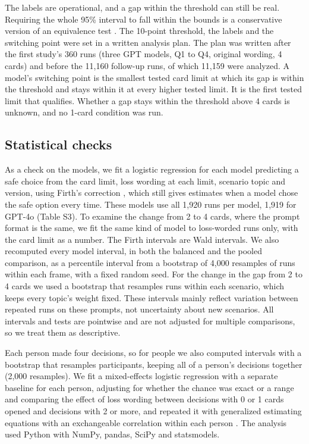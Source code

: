 \documentclass[11pt]{article}
\begin{document}
The labels are operational, and a gap within the threshold can still be real. Requiring the whole 95\% interval to fall within the bounds is a conservative version of an equivalence test \citep{lakens2017equivalence}. The 10-point threshold, the labels and the switching point were set in a written analysis plan. The plan was written after the first study's 360 runs (three GPT models, Q1 to Q4, original wording, 4 cards) and before the 11,160 follow-up runs, of which 11,159 were analyzed. A model's switching point is the smallest tested card limit at which its gap is within the threshold and stays within it at every higher tested limit. It is the first tested limit that qualifies. Whether a gap stays within the threshold above 4 cards is unknown, and no 1-card condition was run.

\subsection{Statistical checks}

As a check on the models, we fit a logistic regression for each model predicting a safe choice from the card limit, loss wording at each limit, scenario topic and version, using Firth's correction \citep{firth1993bias}, which still gives estimates when a model chose the safe option every time. These models use all 1,920 runs per model, 1,919 for GPT-4o (Table S3). To examine the change from 2 to 4 cards, where the prompt format is the same, we fit the same kind of model to loss-worded runs only, with the card limit as a number. The Firth intervals are Wald intervals. We also recomputed every model interval, in both the balanced and the pooled comparison, as a percentile interval from a bootstrap of 4,000 resamples of runs within each frame, with a fixed random seed. For the change in the gap from 2 to 4 cards we used a bootstrap that resamples runs within each scenario, which keeps every topic's weight fixed. These intervals mainly reflect variation between repeated runs on these prompts, not uncertainty about new scenarios. All intervals and tests are pointwise and are not adjusted for multiple comparisons, so we treat them as descriptive.

Each person made four decisions, so for people we also computed intervals with a bootstrap that resamples participants, keeping all of a person's decisions together (2,000 resamples). We fit a mixed-effects logistic regression with a separate baseline for each person, adjusting for whether the chance was exact or a range and comparing the effect of loss wording between decisions with 0 or 1 cards opened and decisions with 2 or more, and repeated it with generalized estimating equations with an exchangeable correlation within each person \citep{liang1986longitudinal}. The analysis used Python with NumPy, pandas, SciPy and statsmodels.
\end{document}
